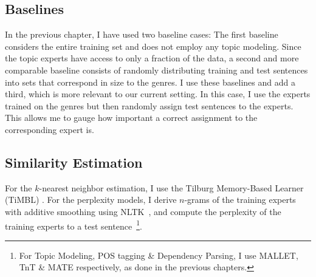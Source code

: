 



\subsection{Baselines}

In the previous chapter, I have used two baseline cases: The first baseline considers the entire training set and does not employ any topic modeling. Since the topic experts have access to only a fraction of the data, a second and more comparable baseline consists of  randomly distributing  training and test sentences into sets that correspond in size to the genres. I use these baselines and add a third, which is more relevant to our current setting. In this case, I use the experts trained on the genres but then randomly assign test sentences to the experts. This allows me to gauge how important a correct assignment to the corresponding expert is. 


\subsection{Similarity Estimation}

For the $k$-nearest neighbor estimation, I use the Tilburg Memory-Based Learner (TiMBL) \citep{daelemans1998timbl}. For the perplexity models, I derive $n$-grams  of the training experts with additive smoothing using NLTK~\citep{loper2002nltk}, and compute the perplexity of the training experts to a test sentence~\footnote{For Topic Modeling, POS tagging \& Dependency Parsing, I use MALLET, TnT \& MATE respectively, as done in the previous chapters.}. 

